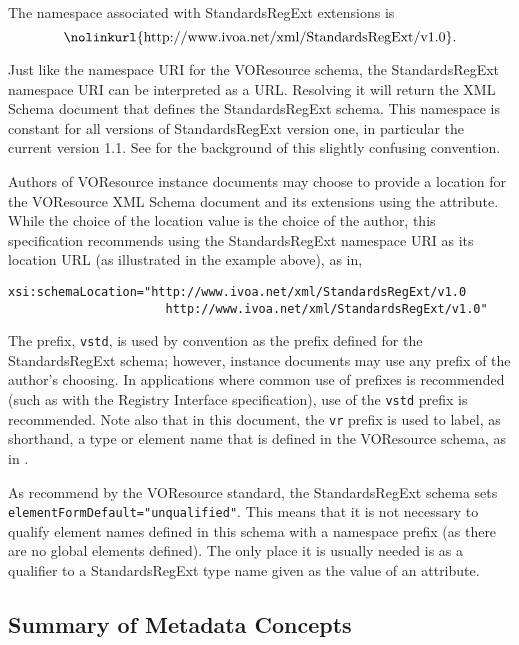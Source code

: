 \documentclass[11pt,a4paper]{ivoa}
\begin{document}
The namespace associated with StandardsRegExt extensions is
$$
\hbox{\nolinkurl{http://www.ivoa.net/xml/StandardsRegExt/v1.0}.}
$$

Just like the namespace URI for the VOResource schema, the
StandardsRegExt namespace URI can be interpreted as a URL.  Resolving it
will return the XML Schema document
that defines the StandardsRegExt schema.  This namespace is constant for
all versions of StandardsRegExt version one, in particular the current
version 1.1.  See \citet{2018ivoa.spec.0529H} for the background of this
slightly confusing convention.

Authors of VOResource instance documents may choose to
provide a location for the VOResource XML Schema document and its
extensions using the
 attribute.  While the choice of
the location value is the choice of the author, this specification
recommends using the StandardsRegExt namespace URI as its location URL
(as illustrated in the example above), as in,



\begin{lstlisting}[basicstyle=\ttfamily\footnotesize]
xsi:schemaLocation="http://www.ivoa.net/xml/StandardsRegExt/v1.0
                      http://www.ivoa.net/xml/StandardsRegExt/v1.0"
\end{lstlisting}

The prefix, \texttt{vstd}, is used by convention as the
prefix defined for the StandardsRegExt schema; however, instance documents
may use any prefix of the author's choosing.  In applications where
common use of prefixes is recommended (such as with the Registry
Interface specification), use of the
\texttt{vstd} prefix is recommended.  Note also that in this
document, the \texttt{vr} prefix is used to label, as shorthand, a
type or element name that is defined in the VOResource schema, as in
.



As recommend by the VOResource standard, the
StandardsRegExt schema sets \verb|elementFormDefault="unqualified"|.
This means that it is not necessary to qualify element names defined
in this schema with a namespace prefix (as there are no global
elements defined).  The only place it is usually needed is as a
qualifier to a StandardsRegExt type name given as the value of an
 attribute.



\subsection{Summary of Metadata Concepts}
\end{document}
